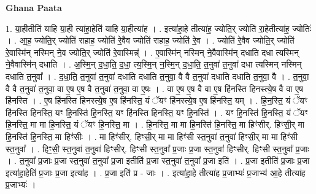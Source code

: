 \documentclass[17pt]{extarticle}
\begin{document}
\textbf{Ghana Paata } \newline

1. या॒हीतीति॑ याहि या॒ही त्या॑हा॒हेति॑ याहि या॒हीत्या॑ह । . इत्या॑हा॒हे तीत्या॑ह॒ ज्योति॒र् ज्योति॑ रा॒हेतीत्या॑ह॒ ज्योतिः॑ । . आ॒ह॒ ज्योति॒र् ज्योति॑ राहाह॒ ज्योति॑ रे॒वैव ज्योति॑ राहाह॒ ज्योति॑ रे॒व । . ज्योति॑ रे॒वैव ज्योति॒र् ज्योति॑ रे॒वास्मि॑न् नस्मिन् ने॒व ज्योति॒र् ज्योति॑ रे॒वास्मिन्न्॑ । . ए॒वास्मि॑न् नस्मिन् ने॒वैवास्मि॑न् दधाति दधा त्यस्मिन् ने॒वैवास्मि॑न् दधाति । . अ॒स्मि॒न् द॒धा॒ति॒ द॒धा॒ त्य॒स्मि॒न् न॒स्मि॒न् द॒धा॒ति॒ त॒नुवा॑ त॒नुवा॑ दधा त्यस्मिन् नस्मिन् दधाति त॒नुवा᳚ । . द॒धा॒ति॒ त॒नुवा॑ त॒नुवा॑ दधाति दधाति त॒नुवा॒ वै वै त॒नुवा॑ दधाति दधाति त॒नुवा॒ वै । . त॒नुवा॒ वै वै त॒नुवा॑ त॒नुवा॒ वा ए॒ष ए॒ष वै त॒नुवा॑ त॒नुवा॒ वा ए॒षः । . वा ए॒ष ए॒ष वै वा ए॒ष हि॑नस्ति हिनस्त्ये॒ष वै वा ए॒ष हि॑नस्ति । . ए॒ष हि॑नस्ति हिनस्त्ये॒ष ए॒ष हि॑नस्ति॒ यं ॅयꣳ हि॑नस्त्ये॒ष ए॒ष हि॑नस्ति॒ यम् । . हि॒न॒स्ति॒ यं ॅयꣳ हि॑नस्ति हिनस्ति॒ यꣳ हि॒नस्ति॑ हि॒नस्ति॒ यꣳ हि॑नस्ति हिनस्ति॒ यꣳ हि॒नस्ति॑ । . यꣳ हि॒नस्ति॑ हि॒नस्ति॒ यं ॅयꣳ हि॒नस्ति॒ मा मा हि॒नस्ति॒ यं ॅयꣳ हि॒नस्ति॒ मा । . हि॒नस्ति॒ मा मा हि॒नस्ति॑ हि॒नस्ति॒ मा हिꣳ॑सीर्. हिꣳसी॒र् मा हि॒नस्ति॑ हि॒नस्ति॒ मा हिꣳ॑सीः । . मा हिꣳ॑सीर्. हिꣳसी॒र् मा मा हिꣳ॑सी स्त॒नुवा॑ त॒नुवा॑ हिꣳसी॒र् मा मा हिꣳ॑सी स्त॒नुवा᳚ । . हिꣳ॒॒सी॒ स्त॒नुवा॑ त॒नुवा॑ हिꣳसीर्. हिꣳसी स्त॒नुवा᳚ प्र॒जाः प्र॒जा स्त॒नुवा॑ हिꣳसीर्. हिꣳसी स्त॒नुवा᳚ प्र॒जाः । . त॒नुवा᳚ प्र॒जाः प्र॒जा स्त॒नुवा॑ त॒नुवा᳚ प्र॒जा इतीति॑ प्र॒जा स्त॒नुवा॑ त॒नुवा᳚ प्र॒जा इति॑ । . प्र॒जा इतीति॑ प्र॒जाः प्र॒जा इत्या॑हा॒हेति॑ प्र॒जाः प्र॒जा इत्या॑ह । . प्र॒जा इति॑ प्र - जाः । . इत्या॑हा॒हे तीत्या॑ह प्र॒जाभ्यः॑ प्र॒जाभ्य॑ आ॒हे तीत्या॑ह प्र॒जाभ्यः॑ । \newline
\end{document}
